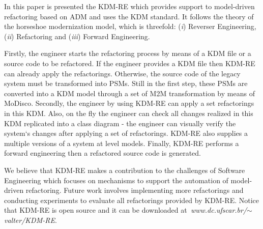 In this paper is presented the KDM-RE which provides support to model-driven refactoring based on ADM and uses the KDM standard. It follows the theory of the horseshoe modernization model, which is threefold: (\textit{i}) Reverser Engineering, (\textit{ii}) Refactoring and  (\textit{iii}) Forward Engineering. 

Firstly, the engineer starts the refactoring process by means of a KDM file or a source code to be refactored. If the engineer provides a KDM file then KDM-RE can already apply the refactorings. Otherwise, the source code of the legacy system must be transformed into PSMs. Still in the first step, these PSMs are converted into a KDM model through a set of M2M transformation by means of MoDisco. Secondly, the engineer by using KDM-RE can apply a set refactorings in this KDM. Also, on the fly the engineer can check all changes realized in this KDM replicated into a class diagram - the engineer can visually verify the system`s changes after applying a set of refactorings. KDM-RE also supplies a multiple versions of a system at level models. Finally, KDM-RE performs a forward engineering then a refactored source code is generated.

We believe that KDM-RE makes a contribution to the challenges of Software Engineering which focuses on mechanisms to support the automation of model-driven refactoring. Future work involves implementing more refactorings and conducting experiments to evaluate all refactorings provided by KDM-RE. Notice that KDM-RE is open source and it can be downloaded at\textit{~www.dc.ufscar.br/$\sim$valter/KDM-RE}.

